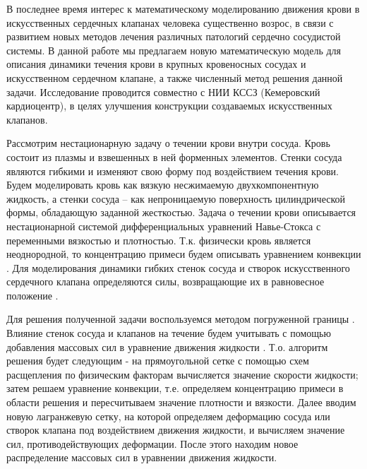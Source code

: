 \documentclass[11pt]{amsart}
\begin{document}



В последнее время интерес к математическому моделированию движения крови в искусственных сердечных клапанах человека существенно возрос, в связи с развитием новых методов лечения различных патологий сердечно сосудистой системы. В данной работе мы предлагаем новую математическую модель для описания динамики течения крови в крупных кровеносных сосудах и искусственном сердечном клапане, а также численный метод решения данной задачи. Исследование проводится совместно с НИИ КССЗ (Кемеровский кардиоцентр), в целях улучшения конструкции создаваемых искусственных клапанов.

Рассмотрим нестационарную задачу о течении крови внутри сосуда. Кровь состоит из плазмы и взвешенных в ней форменных элементов. Стенки сосуда являются гибкими и изменяют свою форму под воздействием течения крови. Будем моделировать кровь как вязкую несжимаемую двухкомпонентную жидкость, а стенки сосуда – как непроницаемую поверхность цилиндрической формы, обладающую заданной жесткостью. Задача о течении крови описывается нестационарной системой дифференциальных уравнений Навье-Стокса \cite{zaharov_miloshevich} с переменными вязкостью и плотностью. Т.к. физически кровь является неоднородной, то концентрацию примеси будем описывать уравнением конвекции \cite{zaharov_miloshevich}. Для моделирования динамики гибких стенок сосуда и створок искусственного сердечного клапана определяются силы, возвращающие их в равновесное положение \cite{boyce}.

Для решения полученной задачи воспользуемся методом погруженной границы \cite{boyce}. Влияние стенок сосуда и клапанов на течение будем учитывать с помощью добавления массовых сил в уравнение движения жидкости \cite{boyce}. Т.о. алгоритм решения будет следующим - на прямоугольной сетке с помощью схем расщепления по физическим факторам вычисляется значение скорости жидкости; затем решаем уравнение конвекции, т.е. определяем концентрацию примеси в области решения и пересчитываем значение плотности и вязкости. Далее вводим новую лагранжевую сетку, на которой определяем деформацию сосуда или створок клапана под воздействием движения жидкости, и вычисляем значение сил, противодействующих деформации. После этого находим новое распределение массовых сил в уравнении движения жидкости.
\end{document}
